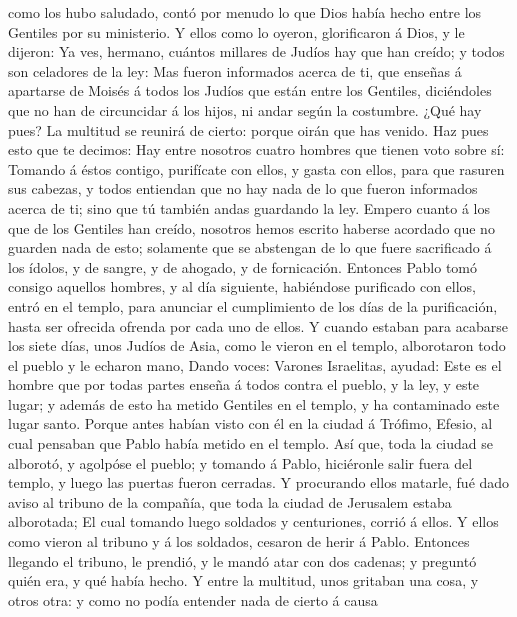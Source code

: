 como los hubo saludado, contó por menudo lo que Dios había hecho entre
los Gentiles por su ministerio.  Y ellos como lo oyeron,
glorificaron á Dios, y le dijeron: Ya ves, hermano, cuántos millares de
Judíos hay que han creído; y todos son celadores de la ley:
 Mas fueron informados acerca de ti, que enseñas á
apartarse de Moisés á todos los Judíos que están entre los Gentiles,
diciéndoles que no han de circuncidar á los hijos, ni andar según la
costumbre.  ¿Qué hay pues? La multitud se reunirá de
cierto: porque oirán que has venido.  Haz pues esto que te
decimos: Hay entre nosotros cuatro hombres que tienen voto sobre sí:
 Tomando á éstos contigo, purifícate con ellos, y gasta con
ellos, para que rasuren sus cabezas, y todos entiendan que no hay nada
de lo que fueron informados acerca de ti; sino que tú también andas
guardando la ley.  Empero cuanto á los que de los Gentiles
han creído, nosotros hemos escrito haberse acordado que no guarden nada
de esto; solamente que se abstengan de lo que fuere sacrificado á los
ídolos, y de sangre, y de ahogado, y de fornicación. 
Entonces Pablo tomó consigo aquellos hombres, y al día siguiente,
habiéndose purificado con ellos, entró en el templo, para anunciar el
cumplimiento de los días de la purificación, hasta ser ofrecida ofrenda
por cada uno de ellos.  Y cuando estaban para acabarse los
siete días, unos Judíos de Asia, como le vieron en el templo,
alborotaron todo el pueblo y le echaron mano,  Dando voces:
Varones Israelitas, ayudad: Este es el hombre que por todas partes
enseña á todos contra el pueblo, y la ley, y este lugar; y además de
esto ha metido Gentiles en el templo, y ha contaminado este lugar santo.
 Porque antes habían visto con él en la ciudad á Trófimo,
Efesio, al cual pensaban que Pablo había metido en el templo.
 Así que, toda la ciudad se alborotó, y agolpóse el pueblo;
y tomando á Pablo, hiciéronle salir fuera del templo, y luego las
puertas fueron cerradas.  Y procurando ellos matarle, fué
dado aviso al tribuno de la compañía, que toda la ciudad de Jerusalem
estaba alborotada;  El cual tomando luego soldados y
centuriones, corrió á ellos. Y ellos como vieron al tribuno y á los
soldados, cesaron de herir á Pablo.  Entonces llegando el
tribuno, le prendió, y le mandó atar con dos cadenas; y preguntó quién
era, y qué había hecho.  Y entre la multitud, unos gritaban
una cosa, y otros otra: y como no podía entender nada de cierto á causa
